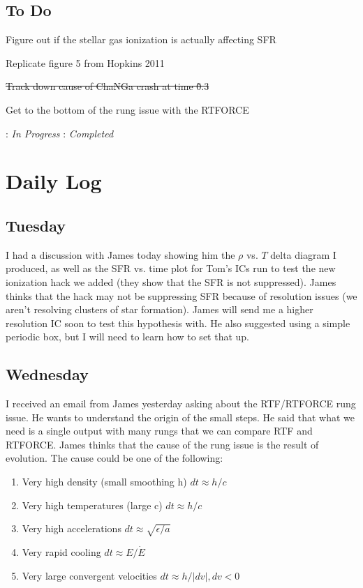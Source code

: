 \documentclass[11pt,letterpaper]{article}
\begin{document}
\subsection*{To Do}
\begin{bullets}
\item[\checkmark] Figure out if the stellar gas ionization is actually affecting SFR
\item[\textleaf] Replicate figure 5 from Hopkins 2011
\item \sout{Track down cause of ChaNGa crash at time \~0.3}
\item Get to the bottom of the rung issue with the RTFORCE
\end{bullets}

\textleaf : \textit{In Progress} \qquad \checkmark : \textit{Completed}

\section*{Daily Log}
\subsection*{Tuesday}
I had a discussion with James today showing him the $\rho$ vs. $T$ delta 
diagram I produced, as well as the SFR vs. time plot for Tom's ICs run to test
the new ionization hack we added (they show that the SFR is not suppressed).  
James thinks that the hack may not be suppressing SFR because of resolution 
issues (we aren't resolving clusters of star formation).  James will send
me a higher resolution IC soon to test this hypothesis with.  He also suggested
using a simple periodic box, but I will need to learn how to set that up.
\subsection*{Wednesday}
I received an email from James yesterday asking about the RTF/RTFORCE rung 
issue.  He wants to understand the origin of the small steps.  He said that
what we need is a single output with many rungs that we can compare RTF and
RTFORCE.  James thinks that the cause of the rung issue is the result of 
evolution.  The cause could be one of the following:
\begin{enumerate}
\item Very high density (small smoothing h) $dt \approx h/c$
\item Very high temperatures (large c) $dt \approx h/c$
\item Very high accelerations $dt \approx \sqrt{\epsilon/a}$
\item Very rapid cooling $dt \approx E/\dot E$
\item Very large convergent velocities $dt \approx h/|dv|, dv < 0$
\end{enumerate}
\end{document}
